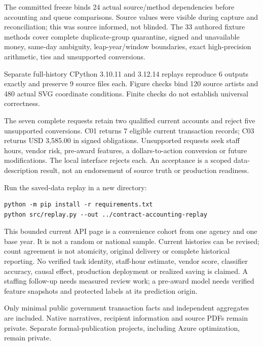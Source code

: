 \documentclass[11pt,letterpaper]{article}
\newcommand{\heading}[1]{\vspace{5pt}{\large\bfseries #1}\par}
\newcommand{\BoundES}{24}
\newcommand{\BoundET}{33}
\newcommand{\BoundEU}{3.10.11}
\newcommand{\BoundEV}{3.12.14}
\newcommand{\BoundEW}{6}
\newcommand{\BoundEX}{9}
\newcommand{\BoundEY}{120}
\newcommand{\BoundEZ}{480}
\newcommand{\BoundFA}{7}
\newcommand{\BoundFB}{3,585.00}
\begin{document}
The committed freeze binds \BoundES{} actual source/method dependencies before accounting and queue comparisons. Source values were visible during capture and reconciliation; this was source informed, not blinded. The \BoundET{} authored fixture methods cover complete duplicate-group quarantine, signed and unavailable money, same-day ambiguity, leap-year/window boundaries, exact high-precision arithmetic, ties and unsupported conversions.

Separate full-history CPython \BoundEU{} and \BoundEV{} replays reproduce \BoundEW{} outputs exactly and preserve \BoundEX{} source files each. Figure checks bind \BoundEY{} source artists and \BoundEZ{} actual SVG coordinate conditions. Finite checks do not establish universal correctness.

\heading{Runnable implementation exercise}
The seven complete requests retain two qualified current accounts and reject five unsupported conversions. C01 returns \BoundFA{} eligible current transaction records; C03 returns USD \BoundFB{} in signed obligations. Unsupported requests seek staff hours, vendor risk, pre-award features, a dollars-to-action conversion or future modifications. The local interface rejects each. An acceptance is a scoped data-description result, not an endorsement of source truth or production readiness.

Run the saved-data replay in a new directory:
\begin{verbatim}
python -m pip install -r requirements.txt
python src/replay.py --out ../contract-accounting-replay
\end{verbatim}

\heading{Material limits and next evidence}
This bounded current API page is a convenience cohort from one agency and one base year. It is not a random or national sample. Current histories can be revised; count agreement is not atomicity, original delivery or complete historical reporting. No verified task identity, staff-hour estimate, vendor score, classifier accuracy, causal effect, production deployment or realized saving is claimed. A staffing follow-up needs measured review work; a pre-award model needs verified feature snapshots and protected labels at its prediction origin.

Only minimal public government transaction facts and independent aggregates are included. Native narratives, recipient information and source PDFs remain private. Separate formal-publication projects, including Azure optimization, remain private.
\end{document}
